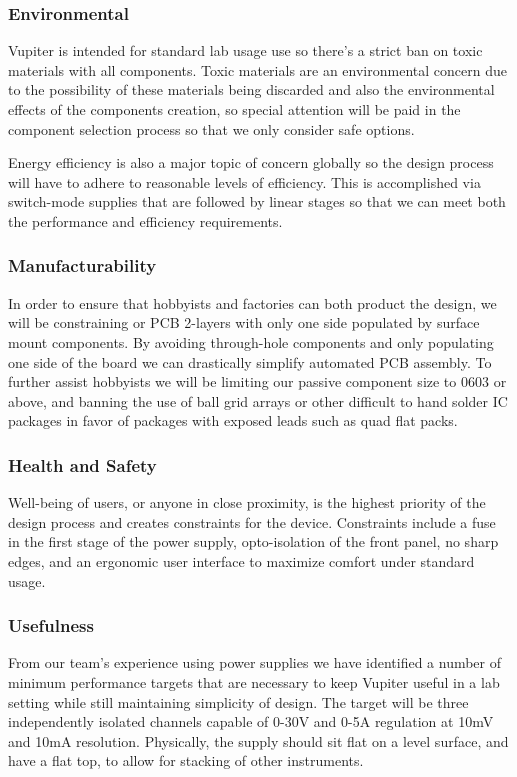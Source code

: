 \documentclass[12pt]{article}
\begin{document}
\subsubsection{Environmental}
Vupiter is intended for standard lab usage use so there’s a strict ban on toxic materials 
with all components. Toxic materials are an environmental concern due to the possibility of these 
materials being discarded and also the environmental effects of the components creation, 
so special attention will be paid in the component selection process so that we only consider safe options.

Energy efficiency is also a major topic of concern globally so the design process will have to adhere to
reasonable levels of efficiency. This is accomplished via switch-mode supplies that are followed by linear stages so that we can meet both the performance and efficiency requirements.

\subsubsection{Manufacturability}
In order to ensure that hobbyists and factories can both product the design, we will be constraining or PCB
2-layers with only one side populated by surface mount components. By avoiding through-hole components and 
only populating one side of the board we can drastically simplify automated PCB assembly. To further assist hobbyists 
we will be limiting our passive component size to 0603 or above, and banning the use of ball grid arrays or other 
difficult to hand solder IC packages in favor of packages with exposed leads such as quad flat packs.
\subsubsection{Health and Safety}
Well-being of users, or anyone in close proximity, is the highest priority of the design process 
and creates constraints for the device. Constraints include a fuse in the first stage of the power supply, opto-isolation of the front panel, no sharp edges, and an ergonomic user interface to maximize comfort under standard usage.

\subsubsection{Usefulness}
From our team’s experience using power supplies we have identified a number of minimum 
performance targets that are necessary to keep Vupiter useful in a lab setting while still 
maintaining simplicity of design. The target will be three independently isolated channels 
capable of 0-30V and 0-5A regulation at 10mV and 10mA resolution. Physically, the supply 
should sit flat on a level surface, and have a flat top, to allow for stacking of other 
instruments.
\end{document}
